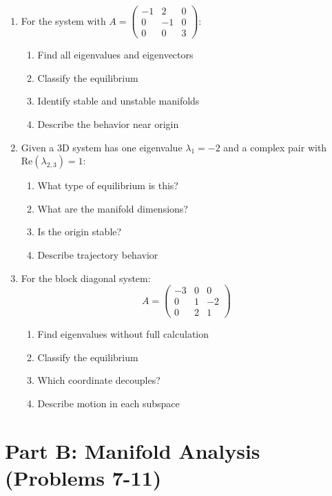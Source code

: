 \documentclass[12pt]{article}
\begin{document}
\begin{enumerate}
\item For the system with $A = \begin{pmatrix} -1 & 2 & 0 \\ 0 & -1 & 0 \\ 0 & 0 & 3 \end{pmatrix}$:
\begin{enumerate}[label=(\alph*)]
    \item Find all eigenvalues and eigenvectors
    \item Classify the equilibrium
    \item Identify stable and unstable manifolds
    \item Describe the behavior near origin
\end{enumerate}

\item Given a 3D system has one eigenvalue $\lambda_{1} = -2$ and a complex pair with $\text{Re}(\lambda_{2,3}) = 1$:
\begin{enumerate}[label=(\alph*)]
    \item What type of equilibrium is this?
    \item What are the manifold dimensions?
    \item Is the origin stable?
    \item Describe trajectory behavior
\end{enumerate}

\item For the block diagonal system:
$$A = \begin{pmatrix} -3 & 0 & 0 \\ 0 & 1 & -2 \\ 0 & 2 & 1 \end{pmatrix}$$
\begin{enumerate}[label=(\alph*)]
    \item Find eigenvalues without full calculation
    \item Classify the equilibrium
    \item Which coordinate decouples?
    \item Describe motion in each subspace
\end{enumerate}
\end{enumerate}

\section*{Part B: Manifold Analysis (Problems 7-11)}
\end{document}
